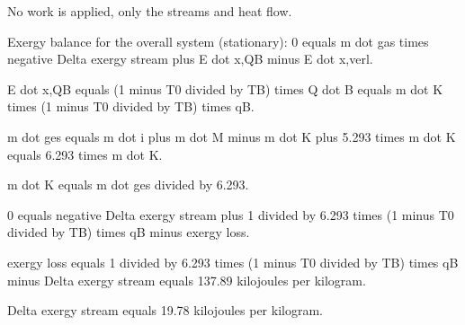 No work is applied, only the streams and heat flow.  

Exergy balance for the overall system (stationary):  
0 equals m dot gas times negative Delta exergy stream plus E dot x,QB minus E dot x,verl.  

E dot x,QB equals (1 minus T0 divided by TB) times Q dot B equals m dot K times (1 minus T0 divided by TB) times qB.  

m dot ges equals m dot i plus m dot M minus m dot K plus 5.293 times m dot K equals 6.293 times m dot K.  

m dot K equals m dot ges divided by 6.293.  

0 equals negative Delta exergy stream plus 1 divided by 6.293 times (1 minus T0 divided by TB) times qB minus exergy loss.  

exergy loss equals 1 divided by 6.293 times (1 minus T0 divided by TB) times qB minus Delta exergy stream equals 137.89 kilojoules per kilogram.  

Delta exergy stream equals 19.78 kilojoules per kilogram.